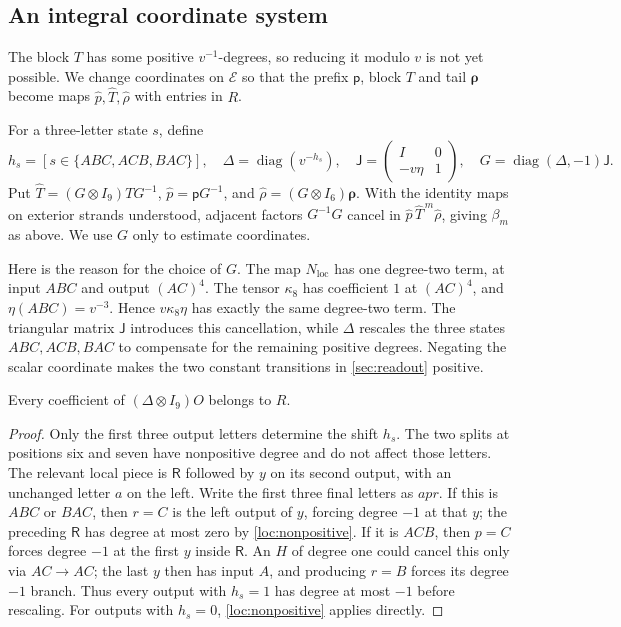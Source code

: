 \documentclass[a4paper,11pt]{amsart}
\newcommand{\pp}{\mathsf p}
\newcommand{\tailmap}{\boldsymbol{\rho}}
\newcommand{\tpar}{v}
\newcommand{\vpar}{{\tpar^{-1}}}
\numberwithin{equation}{subsection}
\theoremstyle{plain}
\theoremstyle{definition}
\theoremstyle{remark}
\begin{document}
\subsection{An integral coordinate system}\label{loc:gauge}

The block $T$ has some positive $\vpar$-degrees, so reducing it
modulo $\tpar$ is not yet possible. We change coordinates on $\mathcal E$
so that the prefix $\pp$, block $T$ and tail $\tailmap$ become maps
$\widehat p,\widehat T,\widehat\rho$ with entries in $R$.

For a three-letter state $s$, define
\[
h_s=[s\in\{ABC,ACB,BAC\}],\quad
\Delta=\operatorname{diag}(\tpar^{-h_s}),\quad
\mathsf J=\begin{pmatrix}I&0\\-\tpar\eta&1\end{pmatrix},\quad
G=\operatorname{diag}(\Delta,-1)\mathsf J.
\]
Put $\widehat T=(G\otimes I_9)TG^{-1}$,
$\widehat p=\pp G^{-1}$, and
$\widehat\rho=(G\otimes I_6)\tailmap$.
With the identity maps on exterior strands understood, adjacent factors
$G^{-1}G$ cancel in $\widehat p\,\widehat T^{\,m}\widehat\rho$, giving $\beta_m$ as above.
We use $G$ only to estimate coordinates.

Here is the reason for the choice of $G$. The map $N_{\mathrm{loc}}$
has one degree-two term, at input $ABC$ and output $(AC)^4$.
The tensor $\kappa_8$ has coefficient $1$ at $(AC)^4$, and
$\eta(ABC)=\tpar^{-3}$. Hence $\tpar\kappa_8\eta$ has exactly the same degree-two
term. The triangular matrix $\mathsf J$ introduces this cancellation, while
$\Delta$ rescales the three states $ABC,ACB,BAC$ to compensate for
the remaining positive degrees. Negating the scalar 
coordinate makes the two constant transitions in
\autoref{sec:readout} positive.

\begin{lemma}\label{loc:outer}
Every coefficient of $(\Delta\otimes I_9)O$ belongs to $R$.
\end{lemma}

\begin{proof}
Only the first three output letters determine the shift $h_s$.
The two splits at positions six and seven have nonpositive degree
and do not affect those letters.
The relevant local piece is $\mathsf R$ followed by $y$ on its second
output, with an unchanged letter $a$ on the left. Write the first three
final letters as $apr$. If this is $ABC$ or $BAC$, then $r=C$ is the
left output of $y$, forcing degree $-1$ at that $y$;
the preceding $\mathsf R$ has degree at most zero by
\autoref{loc:nonpositive}. If it is $ACB$,
then $p=C$ forces degree $-1$ at the first $y$ inside $\mathsf R$.
An $H$ of degree one could cancel this only via $AC\to AC$;
the last $y$ then has input $A$, and producing $r=B$ forces its
degree $-1$ branch. Thus every output with $h_s=1$ has degree at most $-1$ before
rescaling. For outputs with $h_s=0$, \autoref{loc:nonpositive}
applies directly.
\end{proof}
\end{document}
